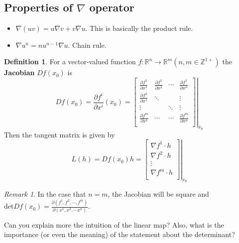 \documentclass[12pt]{article}
\newcommand{\Z}{\mathbb{Z}}
\newcommand{\R}{\mathbb{R}}
\theoremstyle{definition}
\newtheorem{definition}{Definition}[section]
\theoremstyle{remark}
\newtheorem*{remark}{Remark}
\newenvironment{question}[2][QUESTION]{\begin{trivlist}
\item[\hskip \labelsep {\bfseries #1}\hskip \labelsep {\bfseries #2.}]}{\end{trivlist}}
\begin{document}
\subsection{Properties of $\nabla$ operator}
\begin{itemize}
    \item $\nabla(uv) = u\nabla v + v\nabla u$. This is basically the product rule.
    \item $\nabla u^n=nu^{n-1}\nabla u$. Chain rule.
\end{itemize}
\begin{definition}
    For a vector-valued function $f:\R^n\to\R^m (n,m\in \Z^{1+})$ the \textbf{Jacobian} $Df(x_0)$ is 
    $$Df(x_0)=\frac{\partial f^i}{\partial x^i}(x_0)=
    \left.\begin{bmatrix}
       \frac{\partial f^1}{\partial x^1} & \frac{\partial f^1}{\partial x^2} & \cdots & \frac{\partial f^1}{\partial x^n} \\
       \frac{\partial f^2}{\partial x^1} & \ddots & & \vdots \\
       \vdots & & \ddots & \vdots \\
       \frac{\partial f^m}{\partial x^1} & \cdots &\cdots &\frac{\partial f^m}{\partial x^n} \\
    \end{bmatrix}\right|_{x_0}
    $$
    Then the tangent matrix is given by
    $$L(h)=Df(x_0)h=\left.\begin{bmatrix}
       \nabla f^1\cdot h \\ 
       \nabla f^2\cdot h \\ 
       \vdots \\
       \nabla f^m\cdot h \\ 
    \end{bmatrix}\right|_{x_0}$$
\end{definition}
\begin{remark}
   In the case that $n=m$, the Jacobian will be square and $\text{det}Df(x_0)=\frac{\partial(f^1,f^2,\cdots,f^m)}{\partial(x^1,x^2,\cdots x^n)}$. 
\end{remark}
\begin{question}{7}
   Can you explain more the intuition of the linear map? Also, what is the importance (or even the meaning) of the statement about the determinant?\vspace{2in} 
\end{question}{7}
\end{document}
